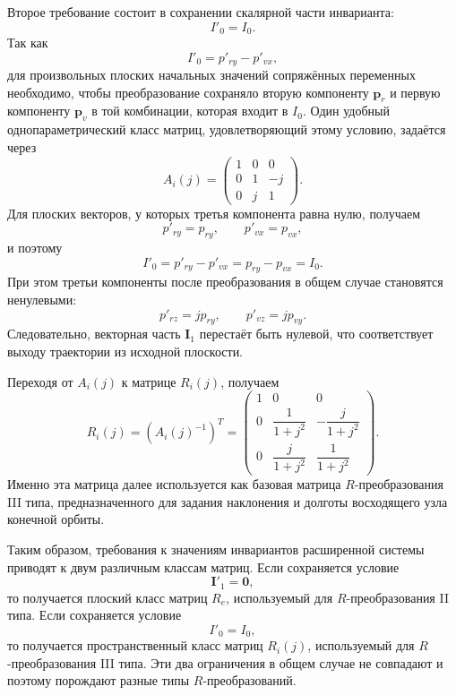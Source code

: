 Второе требование состоит в сохранении скалярной части инварианта:
\begin{equation}
I'_0=I_0.
\end{equation}
Так как
\begin{equation}
I'_0=p'_{ry}-p'_{vx},
\end{equation}
для произвольных плоских начальных значений сопряжённых переменных необходимо, чтобы преобразование сохраняло вторую компоненту \(\mathbf p_r\) и первую компоненту \(\mathbf p_v\) в той комбинации, которая входит в \(I_0\). Один удобный однопараметрический класс матриц, удовлетворяющий этому условию, задаётся через
\begin{equation}
A_i(j)=
\begin{pmatrix}
	1 & 0 & 0\\
	0 & 1 & -j\\
	0 & j & 1
\end{pmatrix}.
\end{equation}
Для плоских векторов, у которых третья компонента равна нулю, получаем
\begin{equation}
p'_{ry}=p_{ry},
\qquad
p'_{vx}=p_{vx},
\end{equation}
и поэтому
\begin{equation}
I'_0=p'_{ry}-p'_{vx}=p_{ry}-p_{vx}=I_0.
\end{equation}
При этом третьи компоненты после преобразования в общем случае становятся ненулевыми:
\begin{equation}
p'_{rz}=jp_{ry},
\qquad
p'_{vz}=jp_{vy}.
\end{equation}
Следовательно, векторная часть \(\mathbf I_1\) перестаёт быть нулевой, что соответствует выходу траектории из исходной плоскости.

Переходя от \(A_i(j)\) к матрице \(R_i(j)\), получаем
\begin{equation}
R_i(j)=\left(A_i(j)^{-1}\right)^T
=
\begin{pmatrix}
	1 & 0 & 0\\
	0 & \dfrac{1}{1+j^2} & -\dfrac{j}{1+j^2}\\
	0 & \dfrac{j}{1+j^2} & \dfrac{1}{1+j^2}
\end{pmatrix}.
\end{equation}
Именно эта матрица далее используется как базовая матрица \(R\)-преобразования III типа, предназначенного для задания наклонения и долготы восходящего узла конечной орбиты.

Таким образом, требования к значениям инвариантов расширенной системы приводят к двум различным классам матриц. Если сохраняется условие
\begin{equation}
\mathbf I'_1=\mathbf 0,
\end{equation}
то получается плоский класс матриц \(R_e\), используемый для \(R\)-преобразования II типа. Если сохраняется условие
\begin{equation}
I'_0=I_0,
\end{equation}
то получается пространственный класс матриц \(R_i(j)\), используемый для \(R\)-преобразования III типа. Эти два ограничения в общем случае не совпадают и поэтому порождают разные типы \(R\)-преобразований.

